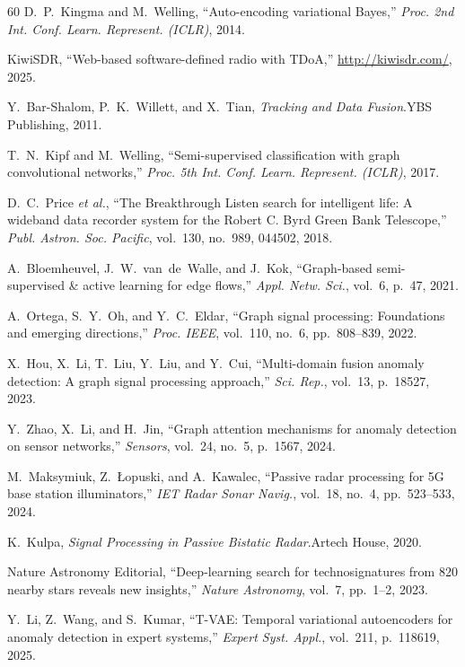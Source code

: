\documentclass[sensors,article,submit,pdftex]{mdpi}
\begin{document}
\begin{thebibliography}{60}
D.~P.~Kingma and M.~Welling, ``Auto-encoding variational Bayes,'' \textit{Proc. 2nd Int. Conf. Learn. Represent. (ICLR)}, 2014.

KiwiSDR, ``Web-based software-defined radio with TDoA,'' \url{http://kiwisdr.com/}, 2025.

Y.~Bar-Shalom, P.~K.~Willett, and X.~Tian, \textit{Tracking and Data Fusion}.\quad YBS Publishing, 2011.

T.~N.~Kipf and M.~Welling, ``Semi-supervised classification with graph convolutional networks,'' \textit{Proc. 5th Int. Conf. Learn. Represent. (ICLR)}, 2017.

D.~C.~Price \textit{et al.}, ``The Breakthrough Listen search for intelligent life: A wideband data recorder system for the Robert C. Byrd Green Bank Telescope,'' \textit{Publ. Astron. Soc. Pacific}, vol.~130, no.~989, 044502, 2018.

A.~Bloemheuvel, J.~W.~van~de~Walle, and J.~Kok, ``Graph-based semi-supervised \& active learning for edge flows,'' \textit{Appl. Netw. Sci.}, vol.~6, p.~47, 2021.

A.~Ortega, S.~Y.~Oh, and Y.~C.~Eldar, ``Graph signal processing: Foundations and emerging directions,'' \textit{Proc. IEEE}, vol.~110, no.~6, pp.~808--839, 2022.

X.~Hou, X.~Li, T.~Liu, Y.~Liu, and Y.~Cui, ``Multi-domain fusion anomaly detection: A graph signal processing approach,'' \textit{Sci. Rep.}, vol.~13, p.~18527, 2023.

Y.~Zhao, X.~Li, and H.~Jin, ``Graph attention mechanisms for anomaly detection on sensor networks,'' \textit{Sensors}, vol.~24, no.~5, p.~1567, 2024.

M.~Maksymiuk, Z.~Łopuski, and A.~Kawalec, ``Passive radar processing for 5G base station illuminators,'' \textit{IET Radar Sonar Navig.}, vol.~18, no.~4, pp.~523--533, 2024.

K.~Kulpa, \textit{Signal Processing in Passive Bistatic Radar}.\quad Artech House, 2020.

Nature Astronomy Editorial, ``Deep-learning search for technosignatures from 820 nearby stars reveals new insights,'' \textit{Nature Astronomy}, vol.~7, pp.~1--2, 2023.

Y.~Li, Z.~Wang, and S.~Kumar, ``T-VAE: Temporal variational autoencoders for anomaly detection in expert systems,'' \textit{Expert Syst. Appl.}, vol.~211, p.~118619, 2025.


\end{thebibliography}
\end{document}
